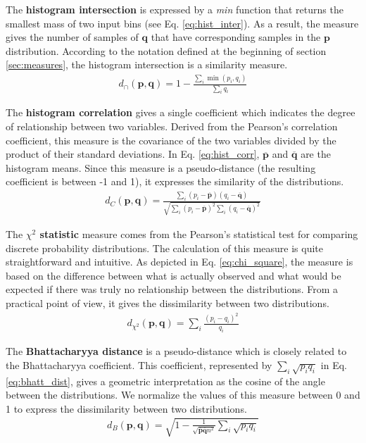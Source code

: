 The \textbf{histogram intersection} \citep{Swain.Ballard:IJCV:1991} is expressed by a \textit{min} function that returns the smallest mass of two input bins (see Eq. \ref{eq:hist_inter}). As a result, the measure gives the number of samples of $\mathbf{q}$ that have corresponding samples in the $\mathbf{p}$ distribution. According to the notation defined at the beginning of section \ref{sec:measures}, the histogram intersection is a similarity measure.
\begin{eqnarray}
d_{\cap}(\mathbf{p}, \mathbf{q}) = 1 - \frac{\sum_{i}\min(p_i, q_i)}{\sum_{i}q_i} \label{eq:hist_inter}
\end{eqnarray}

The \textbf{histogram correlation} gives a single coefficient which indicates the degree of relationship between two variables. Derived from the Pearson's correlation coefficient, this measure is the covariance of the two variables divided by the product of their standard deviations. In Eq. \ref{eq:hist_corr}, $\overline{\mathbf{p}}$ and $\overline{\mathbf{q}}$ are the histogram means. Since this measure is a pseudo-distance (the resulting coefficient is between -1 and 1), it expresses the similarity of the distributions.  
\begin{eqnarray}
d_{C}(\mathbf{p}, \mathbf{q}) = \frac{\sum_{i}(p_i - \overline{\mathbf{p}})(q_i - \overline{\mathbf{q}})}{\sqrt{\sum_{i}(p_i - \overline{\mathbf{p}})^{2}\sum_{i}(q_i - \overline{\mathbf{q}})^{2}}} \label{eq:hist_corr}
\end{eqnarray}

The \textbf{$\chi^2$ statistic} measure comes from the Pearson's statistical test for comparing discrete probability distributions. The calculation of this measure is quite straightforward and intuitive. As depicted in Eq. \ref{eq:chi_square}, the measure is based on the difference between what is actually observed and what would be expected if there was truly no relationship between the distributions. From a practical point of view, it gives the dissimilarity between two distributions.
\begin{eqnarray}
d_{\chi^2}(\mathbf{p},\mathbf{q}) = \sum\nolimits_i \frac{(p_i - q_i)^2}{q_i} \label{eq:chi_square}
\end{eqnarray}


The \textbf{Bhattacharyya distance} \citep{Bhattacharyya:IJS:1946} is a pseudo-distance which is closely related to the Bhattacharyya coefficient. This coefficient, represented by $\sum_i\sqrt{p_{i}q_{i}}$ in Eq. \ref{eq:bhatt_dist}, gives a geometric interpretation as the cosine of the angle between the distributions. We normalize the values of this measure between 0 and 1 to express the dissimilarity between two distributions.
\begin{eqnarray}
d_{B}(\mathbf{p}, \mathbf{q}) = \sqrt{1- \frac{1}{\sqrt{\overline{\mathbf{p}} \overline{\mathbf{q}} n^2}} \sum\nolimits_{i} \sqrt{p_i q_i}} \label{eq:bhatt_dist}
\end{eqnarray}

